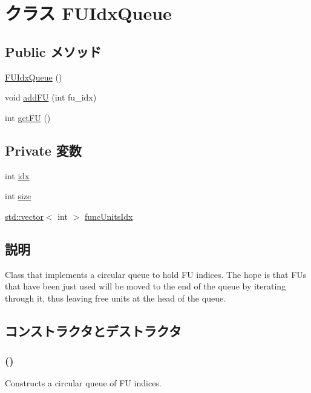 \hypertarget{classFUPool_1_1FUIdxQueue}{
\section{クラス FUIdxQueue}
\label{classFUPool_1_1FUIdxQueue}
}
\subsection*{Public メソッド}
\begin{DoxyCompactItemize}
\item 
\hyperlink{classFUPool_1_1FUIdxQueue_a7c0bcc55f653f2a786817832173501f4}{FUIdxQueue} ()
\item 
void \hyperlink{classFUPool_1_1FUIdxQueue_aba36684921ce8e9e117eeb2037c44730}{addFU} (int fu\_\-idx)
\item 
int \hyperlink{classFUPool_1_1FUIdxQueue_a1c9ed34bc3e46d9661f9d0cd80d67d5e}{getFU} ()
\end{DoxyCompactItemize}
\subsection*{Private 変数}
\begin{DoxyCompactItemize}
\item 
int \hyperlink{classFUPool_1_1FUIdxQueue_ae40354a1051342eb5a9db005715dcfa9}{idx}
\item 
int \hyperlink{classFUPool_1_1FUIdxQueue_a439227feff9d7f55384e8780cfc2eb82}{size}
\item 
\hyperlink{classstd_1_1vector}{std::vector}$<$ int $>$ \hyperlink{classFUPool_1_1FUIdxQueue_a414586295cf439583c9a319205de0b34}{funcUnitsIdx}
\end{DoxyCompactItemize}


\subsection{説明}
Class that implements a circular queue to hold FU indices. The hope is that FUs that have been just used will be moved to the end of the queue by iterating through it, thus leaving free units at the head of the queue. 

\subsection{コンストラクタとデストラクタ}
\hypertarget{classFUPool_1_1FUIdxQueue_a7c0bcc55f653f2a786817832173501f4}{
\subsubsection[{FUIdxQueue}]{ ()}}
\label{classFUPool_1_1FUIdxQueue_a7c0bcc55f653f2a786817832173501f4}
Constructs a circular queue of FU indices. 


